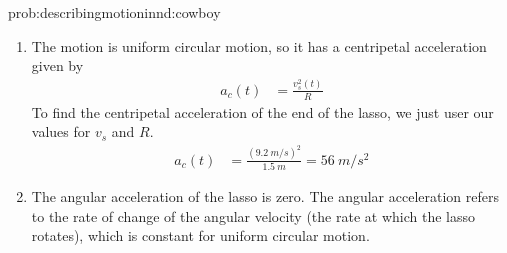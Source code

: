 \begin{solution}{prob:describingmotioninnd:cowboy}
\begin{enumerate}[label=\alph*)]
\item The motion is uniform circular motion, so it has a centripetal acceleration given by
\begin{align*}
a_c(t)&=\frac{v_s^2(t)}{R}
\end{align*}
To find the centripetal acceleration of the end of the lasso, we just user our values for $v_s$ and $R$.
\begin{align*}
a_c(t)&=\frac{(\SI{9.2}{m/s})^2}{\SI{1.5}{m}}=\SI{56}{m/s^2}
\end{align*}
 
\item The angular acceleration of the lasso is zero. The angular acceleration refers to the rate of change of the angular velocity (the rate at which the lasso rotates), which is constant for uniform circular motion.
\end{enumerate}
\end{solution}